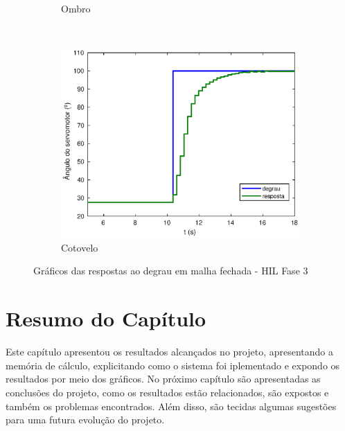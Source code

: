 \begin{figure}[h!]
\begin{subfigure}{.5\textwidth}
    \caption{Ombro}
    \label{fig:shoulder_hilFase3}
  \end{subfigure}%
  \\
  \begin{subfigure}{\textwidth}
    \centering
    \includegraphics[width = 0.5\columnwidth]{Imagens/forearm_hilFase3}
    \caption{Cotovelo}
    \label{fig:forearm_hilFase3}
  \end{subfigure}%
  \caption{Gráficos das respostas ao degrau em malha fechada - HIL Fase 3}
  \label{fig:hilFase3} 

\end{figure}

\section{Resumo do Capítulo}

Este capítulo apresentou os resultados alcançados no projeto, apresentando a memória de cálculo,
explicitando como o sistema foi iplementado e expondo os resultados por meio dos gráficos. No próximo
capítulo são apresentadas as conclusões do projeto, como os resultados estão relacionados, são expostos e também 
os problemas encontrados. Além disso, são tecidas algumas sugestões para uma futura evolução do projeto.


\clearpage